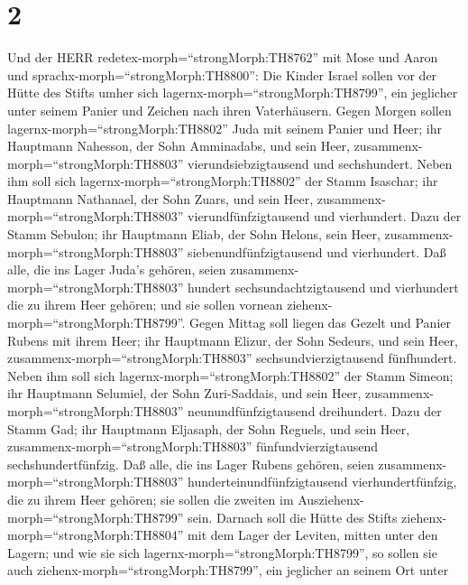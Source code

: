 \hypertarget{section-1}{%
\section{2}\label{section-1}}

 Und der HERR redetex-morph=``strongMorph:TH8762'' mit Mose
und Aaron und sprachx-morph=``strongMorph:TH8800'':  Die
Kinder Israel sollen vor der Hütte des Stifts umher sich
lagernx-morph=``strongMorph:TH8799'', ein jeglicher unter seinem Panier
und Zeichen nach ihren Vaterhäusern.  Gegen Morgen sollen
lagernx-morph=``strongMorph:TH8802'' Juda mit seinem Panier und Heer;
ihr Hauptmann Nahesson, der Sohn Amminadabs,  und sein Heer,
zusammenx-morph=``strongMorph:TH8803'' vierundsiebzigtausend und
sechshundert.  Neben ihm soll sich
lagernx-morph=``strongMorph:TH8802'' der Stamm Isaschar; ihr Hauptmann
Nathanael, der Sohn Zuars,  und sein Heer,
zusammenx-morph=``strongMorph:TH8803'' vierundfünfzigtausend und
vierhundert.  Dazu der Stamm Sebulon; ihr Hauptmann Eliab,
der Sohn Helons,  sein Heer,
zusammenx-morph=``strongMorph:TH8803'' siebenundfünfzigtausend und
vierhundert.  Daß alle, die ins Lager Juda's gehören, seien
zusammenx-morph=``strongMorph:TH8803'' hundert sechsundachtzigtausend
und vierhundert die zu ihrem Heer gehören; und sie sollen vornean
ziehenx-morph=``strongMorph:TH8799''.  Gegen Mittag soll
liegen das Gezelt und Panier Rubens mit ihrem Heer; ihr Hauptmann
Elizur, der Sohn Sedeurs,  und sein Heer,
zusammenx-morph=``strongMorph:TH8803'' sechsundvierzigtausend
fünfhundert.  Neben ihm soll sich
lagernx-morph=``strongMorph:TH8802'' der Stamm Simeon; ihr Hauptmann
Selumiel, der Sohn Zuri-Saddais,  und sein Heer,
zusammenx-morph=``strongMorph:TH8803'' neunundfünfzigtausend
dreihundert.  Dazu der Stamm Gad; ihr Hauptmann Eljasaph,
der Sohn Reguels,  und sein Heer,
zusammenx-morph=``strongMorph:TH8803'' fünfundvierzigtausend
sechshundertfünfzig.  Daß alle, die ins Lager Rubens
gehören, seien zusammenx-morph=``strongMorph:TH8803''
hunderteinundfünfzigtausend vierhundertfünfzig, die zu ihrem Heer
gehören; sie sollen die zweiten im
Ausziehenx-morph=``strongMorph:TH8799'' sein.  Darnach soll
die Hütte des Stifts ziehenx-morph=``strongMorph:TH8804'' mit dem Lager
der Leviten, mitten unter den Lagern; und wie sie sich
lagernx-morph=``strongMorph:TH8799'', so sollen sie auch
ziehenx-morph=``strongMorph:TH8799'', ein jeglicher an seinem Ort unter

